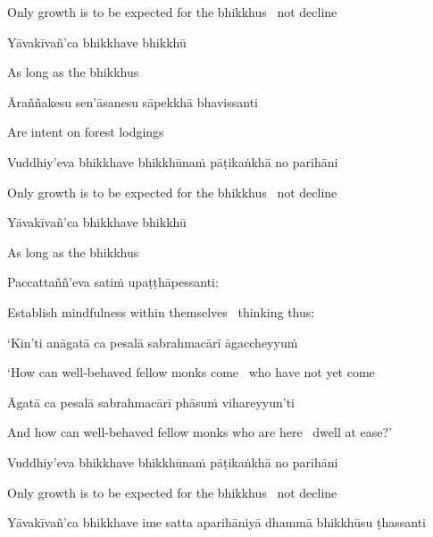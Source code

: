 \begin{english}
  Only growth is to be expected for the bhikkhus \breathmark\ not decline
\end{english}

Yāvakīvañ'ca bhikkhave bhikkhū

\begin{english}
  As long as the bhikkhus
\end{english}

Āraññakesu sen'āsanesu sāpekkhā bhavissanti

\begin{english}
  Are intent on forest lodgings
\end{english}

Vuddhiy'eva bhikkhave bhikkhūnaṁ pāṭikaṅkhā no parihāni

\begin{english}
  Only growth is to be expected for the bhikkhus \breathmark\ not decline
\end{english}

Yāvakīvañ'ca bhikkhave bhikkhū

\begin{english}
  As long as the bhikkhus
\end{english}

Paccattaññ'eva satiṁ upaṭṭhāpessanti:

\begin{english}
  Establish mindfulness within themselves \breathmark\ thinking thus:
\end{english}

`Kin'ti anāgatā ca pesalā sabrahmacārī āgaccheyyuṁ

\begin{english}
  `How can well-behaved fellow monks come \breathmark\ who have not yet come
\end{english}

Āgatā ca pesalā sabrahmacārī phāsuṁ vihareyyun'ti

\begin{english-hang}
  And how can well-behaved fellow monks who are here \breathmark\ dwell at ease?'
\end{english-hang}

Vuddhiy'eva bhikkhave bhikkhūnaṁ pāṭikaṅkhā no parihāni

\begin{english}
  Only growth is to be expected for the bhikkhus \breathmark\ not decline
\end{english}

\begin{pali-hang}
  Yāvakīvañ'ca bhikkhave ime satta aparihāniyā dhammā bhikkhūsu ṭhassanti
\end{pali-hang}

